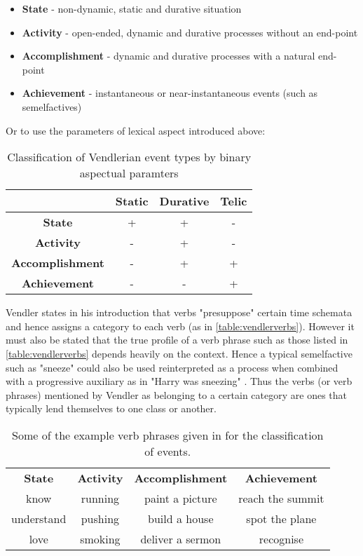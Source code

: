 \begin{itemize}
    \item \textbf{State} - non-dynamic, static and durative situation
    \item \textbf{Activity} - open-ended, dynamic and durative processes without an end-point
    \item \textbf{Accomplishment} - dynamic and durative processes with a natural end-point
    \item \textbf{Achievement} - instantaneous or near-instantaneous events (such as semelfactives)
\end{itemize}

Or to use the parameters of lexical aspect introduced above:
\begin{table}
    \centering
    \begin{tabular}{|c||c|c|c|}
        \hline
                                & Static & Durative & Telic \\ \hline
        \textbf{State}          & +      & +        & - \\ \hline
        \textbf{Activity}       & -      & +        & - \\ \hline
        \textbf{Accomplishment} & -      & +        & + \\ \hline
        \textbf{Achievement}    & -      & -        & + \\ \hline
    \end{tabular}
    \caption{Classification of Vendlerian event types by binary aspectual paramters \citep{Smith1991ThePO}}
\end{table}

Vendler states in his introduction that verbs "presuppose" certain time schemata and hence assigns a category to each verb (as in \ref{table:vendlerverbs}). However it must also be stated that the true profile of a verb phrase such as those listed in \ref{table:vendlerverbs} depends heavily on the context. Hence a typical semelfactive such as "sneeze" could also be used reinterpreted as a process when combined with a progressive auxiliary as in "Harry was sneezing" \citep{moens-steedman-1988-temporal}. Thus the verbs (or verb phrases) mentioned by Vendler as belonging to a certain category are ones that typically lend themselves to one class or another.

\begin{table}
    \centering
    \begin{tabular}{|c|c|c|c|}
        
        \textbf{State} & \textbf{Activity} & \textbf{Accomplishment} & \textbf{Achievement} \\
        know & running & paint a picture & reach the summit \\
        understand & pushing & build a house & spot the plane \\
        love & smoking & deliver a sermon & recognise
    \end{tabular}
    \caption{Some of the example verb phrases given in \citet{vendler57} for the classification of events.}
\end{table}
\label{table:vendlerverbs}

